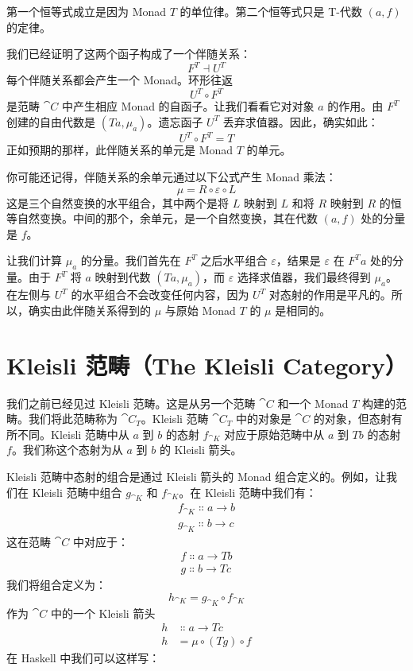 \noindent
第一个恒等式成立是因为 Monad $T$ 的单位律。第二个恒等式只是 T-代数 $(a, f)$ 的定律。

我们已经证明了这两个函子构成了一个伴随关系：
\[F^T \dashv U^T\]
每个伴随关系都会产生一个 Monad。环形往返
\[U^T \circ F^T\]
是范畴 $\cat{C}$ 中产生相应 Monad 的自函子。让我们看看它对对象 $a$ 的作用。由 $F^T$ 创建的自由代数是 $(T a, \mu_a)$。遗忘函子 $U^T$ 丢弃求值器。因此，确实如此：
\[U^T \circ F^T = T\]
正如预期的那样，此伴随关系的单元是 Monad $T$ 的单元。

你可能还记得，伴随关系的余单元通过以下公式产生 Monad 乘法：
\[\mu = R \circ \varepsilon \circ L\]
这是三个自然变换的水平组合，其中两个是将 $L$ 映射到 $L$ 和将 $R$ 映射到 $R$ 的恒等自然变换。中间的那个，余单元，是一个自然变换，其在代数 $(a, f)$ 处的分量是 $f$。

让我们计算 $\mu_a$ 的分量。我们首先在 $F^T$ 之后水平组合 $\varepsilon$，结果是 $\varepsilon$ 在 $F^T a$ 处的分量。由于 $F^T$ 将 $a$ 映射到代数 $(T a, \mu_a)$，而 $\varepsilon$ 选择求值器，我们最终得到 $\mu_a$。在左侧与 $U^T$ 的水平组合不会改变任何内容，因为 $U^T$ 对态射的作用是平凡的。所以，确实由此伴随关系得到的 $\mu$ 与原始 Monad $T$ 的 $\mu$ 是相同的。

\section{Kleisli 范畴（The Kleisli Category）}

我们之前已经见过 Kleisli 范畴。这是从另一个范畴 $\cat{C}$ 和一个 Monad $T$ 构建的范畴。我们将此范畴称为 $\cat{C}_T$。Kleisli 范畴 $\cat{C}_T$ 中的对象是 $\cat{C}$ 的对象，但态射有所不同。Kleisli 范畴中从 $a$ 到 $b$ 的态射 $f_{\cat{K}}$ 对应于原始范畴中从 $a$ 到 $T b$ 的态射 $f$。我们称这个态射为从 $a$ 到 $b$ 的 Kleisli 箭头。

Kleisli 范畴中态射的组合是通过 Kleisli 箭头的 Monad 组合定义的。例如，让我们在 Kleisli 范畴中组合 $g_{\cat{K}}$ 和 $f_{\cat{K}}$。在 Kleisli 范畴中我们有：
\begin{gather*}
  f_{\cat{K}} \Colon a \to b \\
  g_{\cat{K}} \Colon b \to c
\end{gather*}
这在范畴 $\cat{C}$ 中对应于：
\begin{gather*}
  f \Colon a \to T b \\
  g \Colon b \to T c
\end{gather*}
我们将组合定义为：
\[h_{\cat{K}} = g_{\cat{K}} \circ f_{\cat{K}}\]
作为 $\cat{C}$ 中的一个 Kleisli 箭头
\begin{align*}
  h & \Colon a \to T c          \\
  h & = \mu \circ (T g) \circ f
\end{align*}
在 Haskell 中我们可以这样写：

